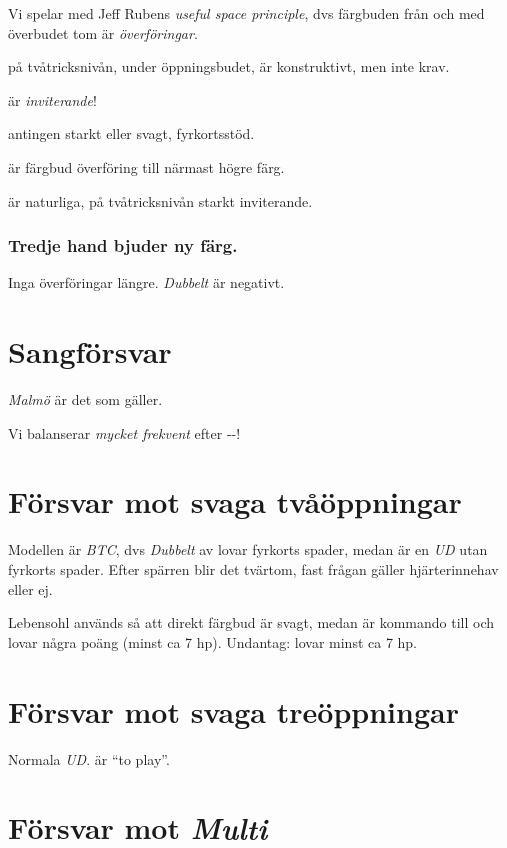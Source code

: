 Vi spelar med Jeff Rubens \emph{useful space principle}, dvs färgbuden från
     och med överbudet tom  är \emph{överföringar}.
     \bbe
       \item[Ny färg] på tvåtricksnivån, under öppningsbudet, är
     konstruktivt,  men inte krav.
       \item[Dubbelhöjning] är \emph{inviterande}!
       \item[3 under] antingen starkt eller svagt, fyrkortsstöd.
 \item[Från och med enkelt överbud] är färgbud överföring till närmast högre
     färg. 

   \item[Sangbud] är naturliga, på tvåtricksnivån starkt inviterande.
     \ebe

\subsubsection{Tredje hand bjuder ny färg.}

Inga överföringar längre. \emph{Dubbelt} är negativt.

\section{Sangförsvar}

{\em Malmö} är det som gäller.

Vi balanserar {\em mycket frekvent} efter -\pass-\pass!

\section{Försvar mot svaga två\-öpp\-ning\-ar}

Modellen är {\em BTC}, dvs {\em Dubbelt} av  lovar fyrkorts spader,
medan  är en {\em UD} utan fyrkorts spader. Efter spärren 
blir det tvärtom, fast frågan gäller hjärterinnehav eller ej.

Lebensohl används så att direkt färgbud är svagt, medan  är
kommando till  och lovar några poäng (minst ca 7 hp). Undantag:
 lovar minst ca 7 hp.

\section{Försvar mot svaga tre\-öpp\-ning\-ar}

Normala \emph{UD}.  är ``to play''.

\section{Försvar mot {\em Multi} }

